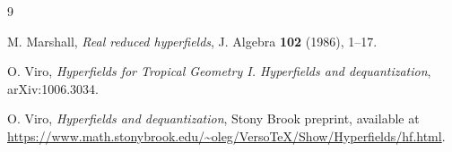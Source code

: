 \documentclass[11pt]{article}
\begin{document}
\begin{thebibliography}{9}

M. Marshall,
\emph{Real reduced hyperfields},
J. Algebra \textbf{102} (1986), 1--17.

O. Viro,
\emph{Hyperfields for Tropical Geometry I. Hyperfields and dequantization},
arXiv:1006.3034.

O. Viro,
\emph{Hyperfields and dequantization},
Stony Brook preprint, available at
\url{https://www.math.stonybrook.edu/~oleg/VersoTeX/Show/Hyperfields/hf.html}.

\end{thebibliography}
\end{document}
